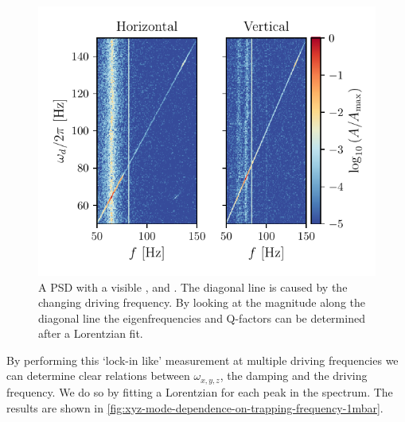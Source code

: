 \begin{figure}
    \centering
    \includegraphics{figures/data/xyz_mode_spectrum.pdf}
    \caption{A PSD with a visible \xmode, \ymode and \zmode. The diagonal line is caused by the changing driving frequency. By looking at the magnitude along the diagonal line the eigenfrequencies and Q-factors can be determined after a Lorentzian fit.}
    \label{fig:xyz-mode-spectrum-1mbar}
\end{figure}

By performing this `lock-in like' measurement at multiple driving frequencies we can determine clear relations between $\omega_{x,y,z}$, the damping and the driving frequency. We do so by fitting a Lorentzian for each peak in the spectrum. The results are shown in \autoref{fig:xyz-mode-dependence-on-trapping-frequency-1mbar}.


